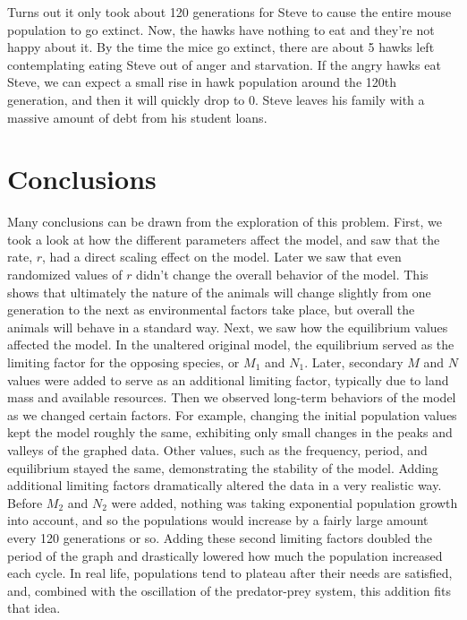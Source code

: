 \documentclass[10pt,letterpaper]{article}
\begin{document}
			\newline \newline
			Turns out it only took about 120 generations for Steve to cause the entire mouse population to go extinct. Now, the hawks have nothing to eat and they're not happy about it. By the time the mice go extinct, there are about 5 hawks left contemplating eating Steve out of anger and starvation. If the angry hawks eat Steve, we can expect a small rise in hawk population around the 120th generation, and then it will quickly drop to 0. Steve leaves his family with a massive amount of debt from his student loans. 
	\section{Conclusions}
		Many conclusions can be drawn from the exploration of this problem. First, we took a look at how the different parameters affect the model, and saw that the rate, $r$, had a direct scaling effect on the model. Later we saw that even randomized values of $r$ didn't change the overall behavior of the model. This shows that ultimately the nature of the animals will change slightly from one generation to the next as environmental factors take place, but overall the animals will behave in a standard way. 
		\newline \newline
		Next, we saw how the equilibrium values affected the model. In the unaltered original model, the equilibrium served as the limiting factor for the opposing species, or $M_{1}$ and $N_{1}$. Later, secondary $M$ and $N$ values were added to serve as an additional limiting factor, typically due to land mass and available resources. 
		\newline \newline
		Then we observed long-term behaviors of the model as we changed certain factors. For example, changing the initial population values kept the model roughly the same, exhibiting only small changes in the peaks and valleys of the graphed data. Other values, such as the frequency, period, and equilibrium stayed the same, demonstrating the stability of the model.
		\newline \newline
		Adding additional limiting factors dramatically altered the data in a very realistic way. Before $M_{2}$ and $N_{2}$ were added, nothing was taking exponential population growth into account, and so the populations would increase by a fairly large amount every 120 generations or so. Adding these second limiting factors doubled the period of the graph and drastically lowered how much the population increased each cycle. In real life, populations tend to plateau after their needs are satisfied, and, combined with the oscillation of the predator-prey system, this addition fits that idea.
\end{document}
